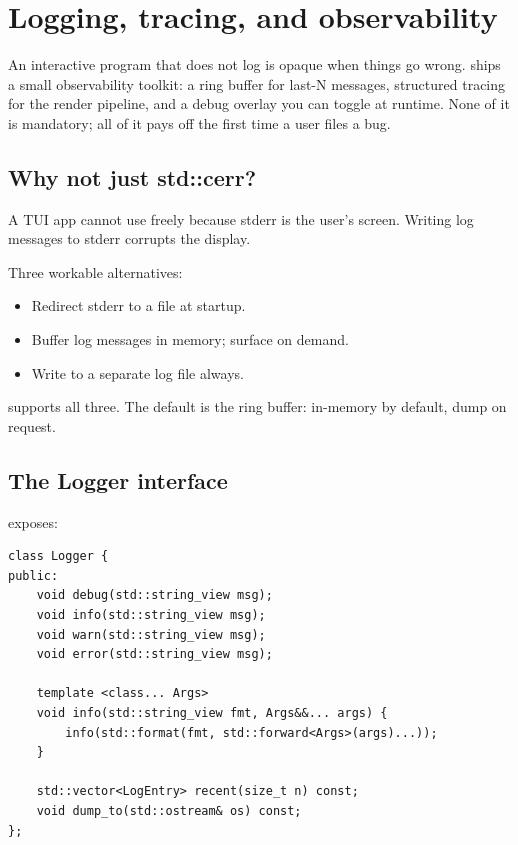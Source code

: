 \chapter{Logging, tracing, and observability}
\label{ch:observability}

\begin{aside}
An interactive program that does not log is opaque when things
go wrong. \maya{} ships a small observability toolkit: a ring
buffer for last-N messages, structured tracing for the render
pipeline, and a debug overlay you can toggle at runtime. None
of it is mandatory; all of it pays off the first time a user
files a bug.
\end{aside}

\section{Why not just std::cerr?}

A TUI app cannot use  freely because stderr is
the user's screen. Writing log messages to stderr corrupts the
display.

Three workable alternatives:

\begin{itemize}[leftmargin=*]
  \item Redirect stderr to a file at startup.
  \item Buffer log messages in memory; surface on demand.
  \item Write to a separate log file always.
\end{itemize}

\maya{} supports all three. The default is the ring buffer:
in-memory by default, dump on request.

\section{The Logger interface}

 exposes:

\begin{lstlisting}
class Logger {
public:
    void debug(std::string_view msg);
    void info(std::string_view msg);
    void warn(std::string_view msg);
    void error(std::string_view msg);

    template <class... Args>
    void info(std::string_view fmt, Args&&... args) {
        info(std::format(fmt, std::forward<Args>(args)...));
    }

    std::vector<LogEntry> recent(size_t n) const;
    void dump_to(std::ostream& os) const;
};
\end{lstlisting}

